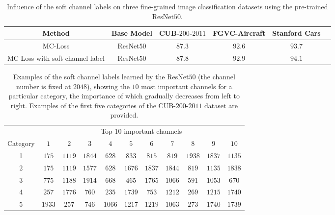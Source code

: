 \documentclass[journal]{IEEEtran}
\begin{document}
\begin{table*}[!t]
  \centering
  \small
\caption{Influence of the soft channel labels on three fine-grained image classification datasets using the pre-trained ResNet$50$.}
    \begin{tabular}{|c|c|c|c|c|c|}
    \hline
    Method                                 & Base Model   & CUB-$200$-$2011$     & FGVC-Aircraft     & Stanford Cars \\
    \hline
    \hline
MC-Loss&                               ResNet$50$     & $87.3$               & $92.6$            & $93.7$  \\          
MC-Loss with soft channel label&       ResNet$50$     & $87.8$               & $92.9$            & $94.1$  \\       
\hline
    \end{tabular}\label{tab:soft}\end{table*}

\begin{table*}[!t]
  \centering
  \caption{Examples of the soft channel labels learned by the  ResNet$50$ (the channel number is fixed at $2048$), showing the $10$ most important channels for a particular category, the importance of which gradually decreases from left to right. Examples of the first five categories of the  CUB-$200$-$2011$ dataset are provided.}
    \begin{tabular}{|c|cccccccccc|}
    \hline
          & \multicolumn{10}{c|}{Top 10 important channels}\\
\cline{2-11}    Category   & $1$     & $2$     & $3$     & $4$     & $5$     & $6$     & $7$     & $8$     &$9$      & $10$ \\
    \hline
    \hline
    1                   & $175$   & $1119$  & $1844$  & $628$   & $833$   & $815$   & $819$   & $1938$  & $1837$  & $1135$ \\
    2                   & $175$   & $1119$  & $1577$  & $628$   & $1676$  & $1837$  & $1844$  & $819$   & $1135$  & $1838$ \\
    3                   & $775$   & $1188$  & $1914$  & $668$   & $465$   & $1765$  & $1066$  & $591$   & $1053$  & $670$ \\
    4                   & $257$   & $1776$  & $760$   & $235$   & $1739$  & $753$   & $1212$  & $269$   & $1215$  & $1740$ \\
    5                   & $1933$  & $257$   & $746$   & $1066$  & $1217$  & $1219$  & $1063$  & $273$   & $1740$  & $1739$ \\
    \hline
    \end{tabular}\label{tab:channels}\end{table*}
\end{document}
